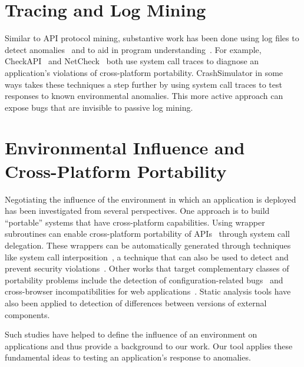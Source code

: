 \section{Tracing and Log Mining}
Similar to API protocol mining, substantive work has been done using
log files to detect anomalies~\cite{pinpoint,
jiang_abnormal_trace_detection_icac_2005, xu2009detecting, lou2010mining2}
and to aid in program understanding~\cite{yuan2010sherlog,
beschastnikh_synoptic_fse_2011, csight_icse_2014}.
For example, CheckAPI~\cite{rasley2015detecting}
and NetCheck~\cite{Zhuang_NSDI_2014} both
use system call traces to diagnose an application's violations of
cross-platform portability.  CrashSimulator in some ways takes these
techniques a step further by using
system call traces
to test responses to known environmental anomalies.
This more active approach can expose bugs that
are invisible to passive log mining.


\section{Environmental Influence and Cross-Platform Portability}
Negotiating the influence of the environment in which an
application is deployed has been investigated from several
perspectives. One approach
is to build ``portable'' systems
that have cross-platform capabilities.
Using wrapper subroutines
can enable cross-platform portability
of APIs~\cite{bartolomeicompliance} through system call delegation.
These wrappers can be automatically generated through techniques like
system call interposition~\cite{Guo:2011:CUS:2002181.2002202}, a
technique that can also be used to detect and prevent security
violations~\cite{Hofmeyr:1998:IDU:1298081.1298084,
Acharya:2000:MUP:1251306.1251307}.
Other works that target complementary classes of portability problems
include the detection of configuration-related bugs~\cite{skoll:icse:2004,
Yilmaz:issta:2004, Fouche:issta:2009, Kastner12, Nguyen14} and
cross-browser incompatibilities for web
applications~\cite{DBLP:conf/icsm/ChoudharyVO10, silakov2010improving,
DBLP:conf/icse/Choudhary11, Mesbah:2011:ACC:1985793.1985870,
DBLP:conf/icst/DallmeierP0MZ14}.  Static analysis tools have also been applied to
detection of differences between versions of external components.

Such studies have helped to define the influence of an environment on
applications and thus provide a background to our work.  Our tool applies
these fundamental ideas to testing an application's response to anomalies.

